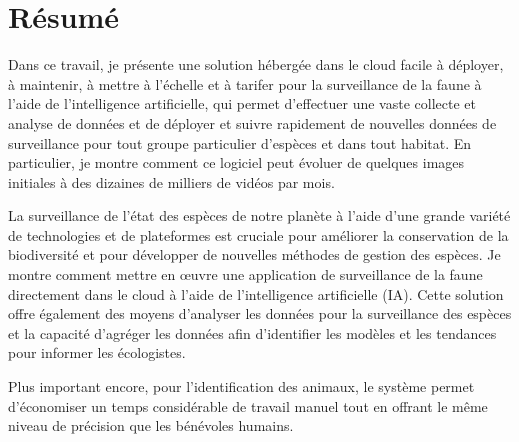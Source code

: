 
\chapter{Résumé}
Dans ce travail, je présente une solution hébergée dans le cloud facile à déployer, à maintenir, à mettre à l'échelle et à tarifer pour la surveillance de la faune à l'aide de l'intelligence artificielle, qui permet d'effectuer une vaste collecte et analyse de données et de déployer et suivre rapidement de nouvelles données de surveillance pour tout groupe particulier d'espèces et dans tout habitat. En particulier, je montre comment ce logiciel peut évoluer de quelques images initiales à des dizaines de milliers de vidéos par mois.

La surveillance de l'état des espèces de notre planète à l'aide d'une grande variété de technologies et de plateformes est cruciale pour améliorer la conservation de la biodiversité et pour développer de nouvelles méthodes de gestion des espèces. Je montre comment mettre en œuvre une application de surveillance de la faune directement dans le cloud à l'aide de l'intelligence artificielle (IA). Cette solution offre également des moyens d'analyser les données pour la surveillance des espèces et la capacité d'agréger les données afin d'identifier les modèles et les tendances pour informer les écologistes.

Plus important encore, pour l'identification des animaux, le système permet d'économiser un temps considérable de travail manuel tout en offrant le même niveau de précision que les bénévoles humains.